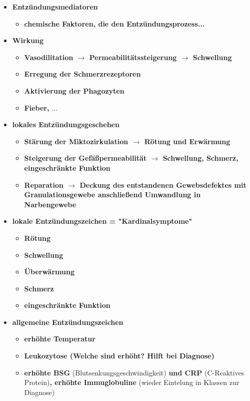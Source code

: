 \begin{itemize}
\begin{itemize}
			\end{itemize}
		\item \textbf{Entzündungsmediatoren}
			\begin{itemize}
				\item \textbf{chemische Faktoren, die den Entzündungsprozess...}
			\end{itemize}
		\item \textbf{Wirkung}
			\begin{itemize}
				\item \textbf{Vasodilitation $\rightarrow$ Permeabilitätssteigerung $\rightarrow$ Schwellung }
				\item \textbf{Erregung der Schmerzrezeptoren}
				\item \textbf{Aktivierung der Phagozyten}
				\item \textbf{Fieber, $\dots$}
			\end{itemize}
		\item \textbf{lokales Entzündungsgeschehen}
			\begin{itemize}
				\item \textbf{Stärung der Miktozirkulation $\rightarrow$ Rötung und Erwärmung}
				\item \textbf{Steigerung der Gefäßpermeabilität $\rightarrow$ Schwellung, Schmerz, eingeschränkte Funktion}
				\item \textbf{Reparation $\rightarrow$ Deckung des entstandenen Gewebsdefektes mit Granulationsgewebe anschließend Umwandlung in Narbengewebe}
			\end{itemize}
		\item \textbf{lokale Entzündungszeichen = "Kardinalsymptome"}
			\begin{itemize}
				\item \textbf{Rötung}
				\item \textbf{Schwellung}
				\item \textbf{Überwärmung}
				\item \textbf{Schmerz}
				\item \textbf{eingeschränkte Funktion}
			\end{itemize}
		\item \textbf{allgemeine Entzündungszeichen}
			\begin{itemize}
				\item \textbf{erhöhte Temperatur}
				\item \textbf{Leukozytose (Welche sind erhöht? Hilft bei Diagnose)}
				\item \textbf{erhöhte BSG} (Blutsenkungsgeschwindigkeit) \textbf{und CRP} (C-Reaktives Protein)\textbf{, erhöhte Immuglobuline} (wieder Eintelung in Klassen zur Diagnose)

\end{itemize}
\end{itemize}
